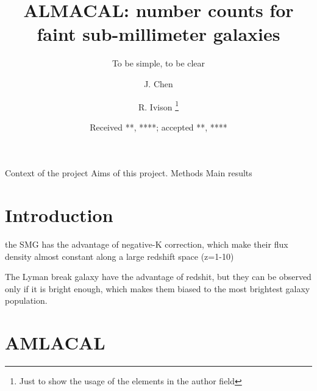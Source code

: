 \documentclass{ref/aa}
\begin{document}
 


   \title{ALMACAL: number counts for faint sub-millimeter galaxies}

   \subtitle{To be simple, to be clear}

   \author{J. Chen
          \and
          R. Ivison \fnmsep\thanks{Just to show the usage
          of the elements in the author field}
          }


   \date{Received **, ****; accepted **, ****}

 
  \abstract
   {Context of the project}
   {Aims of this project.}
   {Methods}
   {Main results}
   {}


   \maketitle
%

\section{Introduction}

the SMG has the advantage of negative-K correction, which make their flux density almost constant along a large redshift space (z=1-10)

The Lyman break galaxy have the advantage of redshit, but they can be observed only if it is bright enough, which makes them biased to the most brightest galaxy population.

\citep{Barger1998}
\section{AMLACAL}
\end{document}

